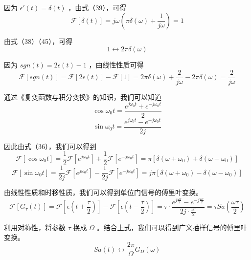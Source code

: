 \documentclass[UTF8,a4paper,11pt]{article}
\begin{document}
因为 $\epsilon'(t)=\delta(t)$ ，由式（39），可得
\begin{equation}
\mathscr{F}[\delta(t)]=j\omega(\pi\delta(\omega)+\frac{1}{j\omega})=1
\end{equation}

由式（38）（45），可得
\begin{equation}
1\leftrightarrow 2\pi\delta(\omega)
\end{equation}

因为 $sgn(t)=2\epsilon(t)-1$ ，由线性性质可得
\begin{equation}
\mathscr{F}[sgn(t)]=\mathscr{F}[2\epsilon(t)]-\mathscr{F}[1]=2\pi\delta(\omega)+\frac{2}{j\omega}-2\pi\delta(\omega)=\frac{2}{j\omega}
\end{equation}

通过《复变函数与积分变换》的知识，我们可以知道
\begin{equation}
\cos\omega_0t=\frac{e^{j\omega_0 t}+e^{-j\omega_0 t}}{2}
\end{equation}
\begin{equation}
\sin\omega_0t=\frac{e^{j\omega_0 t}-e^{-j\omega_0 t}}{2j}
\end{equation}

因此由式（36），我们可以得到
\begin{equation}
\mathscr{F}[\cos\omega_0t]=\frac{1}{2}\mathscr{F}[e^{j\omega_0 t}]+\frac{1}{2}\mathscr{F}[e^{-j\omega_0 t}]=\pi[\delta(\omega+\omega_0)+\delta(\omega-\omega_0)]
\end{equation}
\begin{equation}
\mathscr{F}[\sin\omega_0t]=\frac{1}{2j}\mathscr{F}[e^{j\omega_0 t}]-\frac{1}{2j}\mathscr{F}[e^{-j\omega_0 t}]=j\pi[\delta(\omega+\omega_0)-\delta(\omega-\omega_0)]
\end{equation}

由线性性质和时移性质，我们可以得到单位门信号的傅里叶变换。
\begin{equation}
\mathscr{F}[G_{\tau}(t)]=\mathscr{F}[\epsilon(t+\frac{\tau}{2})]-\mathscr{F}[\epsilon(t-\frac{\tau}{2})]=\tau\cdot\frac{e^{j\frac{\omega\tau}{2}}-e^{-j\frac{\omega\tau}{2}}}{2j\cdot\frac{\omega\tau}{2}}=\tau Sa(\frac{\omega\tau}{2})
\end{equation}

利用对称性，将参数 $\tau$ 换成 $\Omega$ 。结合上式，我们可以得到广义抽样信号的傅里叶变换。
\begin{equation}
Sa(t)\leftrightarrow \frac{2\pi}{\Omega}G_{\Omega}(\omega)
\end{equation}
\end{document}
